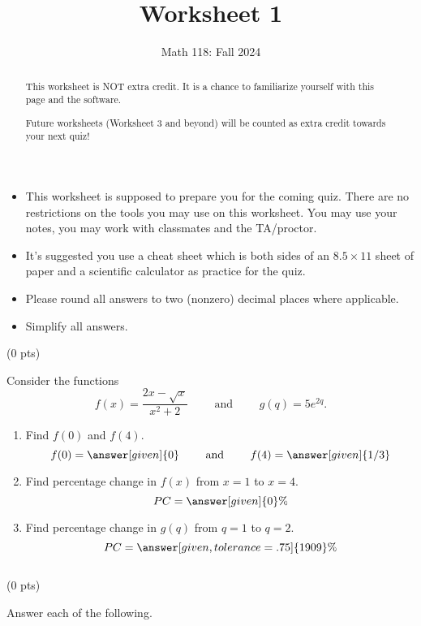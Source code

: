\documentclass{ximera}
\title{Worksheet 1}
\author{Math 118: Fall 2024}
\begin{document}
\begin{abstract}
This worksheet is NOT extra credit. It is a chance to familiarize yourself with this page and the software. 

Future worksheets (Worksheet 3 and beyond) will be counted as extra credit towards your next quiz!
\end{abstract}
\maketitle


\begin{itemize}
    \item This worksheet is supposed to prepare you for the coming quiz. There are no restrictions on the tools you may use on this worksheet. You may use your notes, you may work with classmates and the TA/proctor. 
    \item It's suggested you use a cheat sheet which is both sides of an $8.5\times 11$ sheet of paper and a scientific calculator as practice for the quiz.
    \item Please round all answers to two (nonzero) decimal places where applicable.
    \item Simplify all answers.
\end{itemize}


 (0 pts)

Consider the functions $$f(x)=\frac{2x-\sqrt{x}}{x^2+2}\qquad\text{ and }\qquad g(q)=5e^{2q}.$$

     \begin{enumerate}[label=(\alph*)]
        \item Find $f(0)$ and $f(4)$. $$f(0)=\answer[given]{0}\qquad\text{ and }\qquad f(4)=\answer[given]{1/3}$$ \vspace{5cm}
        \item Find percentage change in $f(x)$ from $x=1$ to $x=4$. $$PC = \answer[given]{0}\%$$ \vspace{5cm}
        \item Find percentage change in $g(q)$ from $q=1$ to $q=2$. $$PC = \answer[given,tolerance=.75]{1909}\%$$
    \end{enumerate}





\newpage $\,$
\newpage


 (0 pts)

Answer each of the following.
\end{document}
